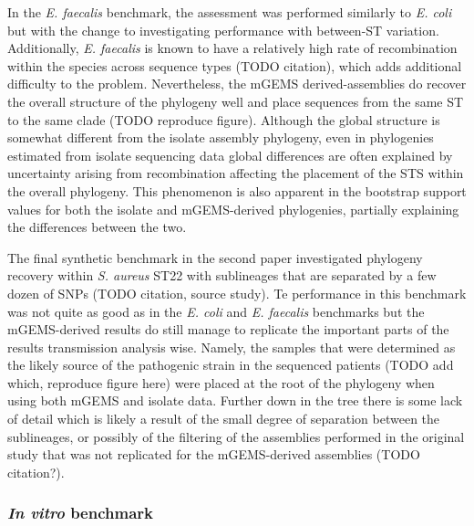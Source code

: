 \documentclass[officiallayout]{tktla}
\begin{document}
In the \textit{E. faecalis} benchmark, the assessment was performed
similarly to \textit{E. coli} but with the change to investigating
performance with between-ST variation. Additionally,
\textit{E. faecalis} is known to have a relatively high rate of
recombination within the species across sequence types (TODO
citation), which adds additional difficulty to the
problem. Nevertheless, the mGEMS derived-assemblies do recover the
overall structure of the phylogeny well and place sequences from the
same ST to the same clade (TODO reproduce figure). Although the global
structure is somewhat different from the isolate assembly phylogeny,
even in phylogenies estimated from isolate sequencing data global
differences are often explained by uncertainty arising from
recombination affecting the placement of the STS within the overall
phylogeny. This phenomenon is also apparent in the bootstrap support
values for both the isolate and mGEMS-derived phylogenies, partially
explaining the differences between the two.

The final synthetic benchmark in the second paper investigated
phylogeny recovery within \textit{S. aureus} ST22 with sublineages
that are separated by a few dozen of SNPs (TODO citation, source
study). Te performance in this benchmark was not quite as good as in
the \textit{E. coli} and \textit{E. faecalis} benchmarks but the
mGEMS-derived results do still manage to replicate the important parts
of the results transmission analysis wise. Namely, the samples that
were determined as the likely source of the pathogenic strain in the
sequenced patients (TODO add which, reproduce figure here) were placed
at the root of the phylogeny when using both mGEMS and isolate
data. Further down in the tree there is some lack of detail which is
likely a result of the small degree of separation between the
sublineages, or possibly of the filtering of the assemblies performed
in the original study that was not replicated for the mGEMS-derived
assemblies (TODO citation?).

\subsubsection{\textit{In vitro} benchmark}
\end{document}
